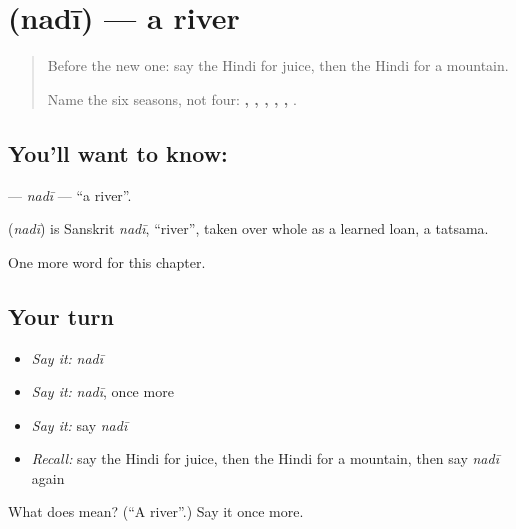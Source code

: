 \section[\texorpdfstring{\hi{नदी} (nadī)}{नदी (nadī)}]{ (nadī) — a river}

\label{lesson:HI-C142-nadi}



\begin{quote}
Before the new one: say the Hindi for juice, then the Hindi for a mountain.

Name the six seasons, not four: \textbf{, , , , , }.
\end{quote}

\subsection*{You'll want to know: }
\textbf{} — \emph{nadī} — \textquotedblleft{}a river\textquotedblright{}.

\begin{cousinweb}
\textbf{} (\emph{nadī}) is Sanskrit \emph{nadī}, \textquotedblleft{}river\textquotedblright{}, taken over whole as a learned loan, a tatsama.
\end{cousinweb}

\begin{grammarlens}[title={What you've built}]
One more word for this chapter.
\end{grammarlens}

\subsection*{Your turn}
\begin{itemize}
\raggedright
  \item \emph{Say it:} \emph{nadī}
  \item \emph{Say it:} \emph{nadī}, once more
  \item \emph{Say it:} say \emph{nadī}
  \item \emph{Recall:} say the Hindi for juice, then the Hindi for a mountain, then say \emph{nadī} again
\end{itemize}

\begin{tcolorbox}[breakable,colback=teal!4,colframe=teal!35!black,title={Before you move on}]
What does  mean? (\textquotedblleft{}A river\textquotedblright{}.) Say it once more.
\end{tcolorbox}
